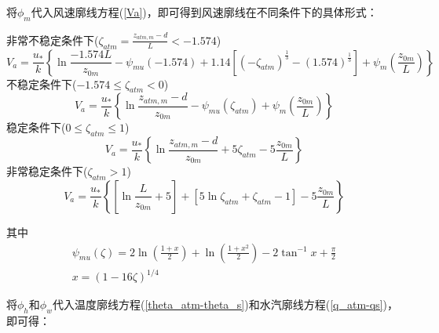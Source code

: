 将$\phi_m$代入风速廓线方程(\ref{Va})，即可得到风速廓线在不同条件下的具体形式：

\noindent 非常不稳定条件下($\zeta_{atm}=\frac{z_{atm,m}-d}{L}<-1.574$)
\begin{equation}\label{Va_VU}
V_{a}=\frac{u_{*}}{k}\left\{\ln \frac{-1.574 L}{z_{0 m}}-\psi_{mu}(-1.574)+
1.14\left[\left(-\zeta_{atm}\right)^{\frac{1}{3}}-(1.574)^{\frac{1}{3}}\right]+\psi_{m}\left(\frac{z_{0 m}}{L}\right)\right\}
\end{equation}
不稳定条件下($-1.574\le\zeta_{atm}<0$)
\begin{equation}\label{Va_U}
V_{a}=\frac{u_{*}}{k}\left\{\ln \frac{z_{atm, m}-d}{z_{0 m}}-\psi_{mu}\left(\zeta_{atm}\right)+\psi_{m}\left(\frac{z_{0 m}}{L}\right)\right\}
\end{equation}
稳定条件下($0\le\zeta_{atm}\le1$)
\begin{equation}\label{Va_S}
V_{a}=\frac{u_{*}}{k}\left\{\ln \frac{z_{atm, m}-d}{z_{0 m}}+5 \zeta_{atm}-5 \frac{z_{0 m}}{L}\right\}
\end{equation}
非常稳定条件下($\zeta_{atm}>1$)
\begin{equation}\label{Va_VS}
V_{a}=\frac{u_{*}}{k}\left\{\left[\ln \frac{L}{z_{0 m}}+5\right]+\left[5 \ln \zeta_{atm}+\zeta_{atm}-1\right]-5 \frac{z_{0 m}}{L}\right\}
\end{equation}

\noindent 其中
\begin{equation}\label{Psim}
\begin{array}{c}\psi_{mu}\left(\zeta\right)=2\ln{(\frac{1+x}{2})}+\ln{\left(\frac{1+x^2}{2}\right)-2}\tan^{-1}{x}+\frac{\pi}{2} \\
      x={(1-16\zeta)}^{1/4}\end{array}
\end{equation}

将$\phi_h$和$\phi_w$代入温度廓线方程(\ref{theta_atm-theta_s})和水汽廓线方程(\ref{q_atm-qs})，即可得：

